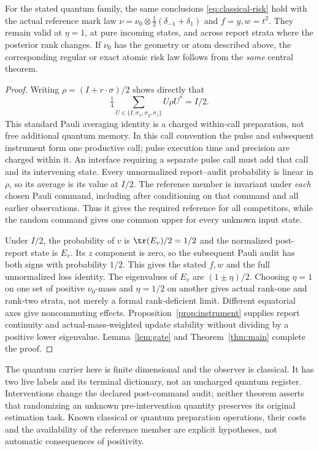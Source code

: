 \begin{theorem}\label{thm:quantum}
For the stated quantum family, the same conclusions \eqref{eq:classical-risk} hold with the actual reference mark law
$\nu=\nu_0\otimes\tfrac12(\delta_{-1}+\delta_1)$ and $f=y,w=t^2$. They remain valid at $\eta=1$, at pure incoming states, and across report strata where the posterior rank changes. If $\nu_0$ has the geometry or atom described above, the corresponding regular or exact atomic risk law follows from the \emph{same} central theorem.
\end{theorem}
\begin{proof}
Writing $\rho=(I+r\cdot\sigma)/2$ shows directly that
\[
 \tfrac14\sum_{U\in\{I,\sigma_x,\sigma_y,\sigma_z\}}U\rho U^*=I/2.
\]
This standard Pauli averaging identity \cite{AMTW} is a charged within-call preparation, not free additional quantum memory. In this call convention the pulse and subsequent instrument form one productive call; pulse execution time and precision are charged within it. An interface requiring a separate pulse call must add that call and its intervening state. Every unnormalized report--audit probability is linear in $\rho$, so its average is its value at $I/2$. The reference member is invariant under \emph{each} chosen Pauli command, including after conditioning on that command and all earlier observations. Thus it gives the required reference for all competitors, while the random command gives one common upper for every unknown input state.

Under $I/2$, the probability of $v$ is $\tr(E_v)/2=1/2$ and the normalized post-report state is $E_v$. Its $z$ component is zero, so the subsequent Pauli audit has both signs with probability $1/2$. This gives the stated $f,w$ and the full unnormalized loss identity. The eigenvalues of $E_v$ are $(1\pm\eta)/2$. Choosing $\eta=1$ on one set of positive $\nu_0$-mass and $\eta=1/2$ on another gives actual rank-one and rank-two strata, not merely a formal rank-deficient limit. Different equatorial axes give noncommuting effects. Proposition~\ref{prop:instrument} supplies report continuity and actual-mass-weighted update stability without dividing by a positive lower eigenvalue. Lemma~\ref{lem:gate} and Theorem~\ref{thm:main} complete the proof.
\end{proof}

The quantum carrier here is finite dimensional and the observer is classical. It has two live labels and its terminal dictionary, not an uncharged quantum register. Interventions change the declared post-command audit; neither theorem asserts that randomizing an unknown pre-intervention quantity preserves its original estimation task. Known classical or quantum preparation operations, their costs and the availability of the reference member are explicit hypotheses, not automatic consequences of positivity.


